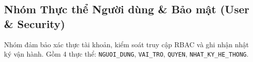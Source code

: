 \setlength{\arrayrulewidth}{0.65pt}
\renewcommand{\arraystretch}{1.55}

\subsection{Nhóm Thực thể Người dùng \& Bảo mật (User \& Security)}

Nhóm đảm bảo xác thực tài khoản, kiểm soát truy cập RBAC và ghi nhận nhật ký vận hành. Gồm 4 thực thể: \texttt{NGUOI\_DUNG}, \texttt{VAI\_TRO}, \texttt{QUYEN}, \texttt{NHAT\_KY\_HE\_THONG}.

